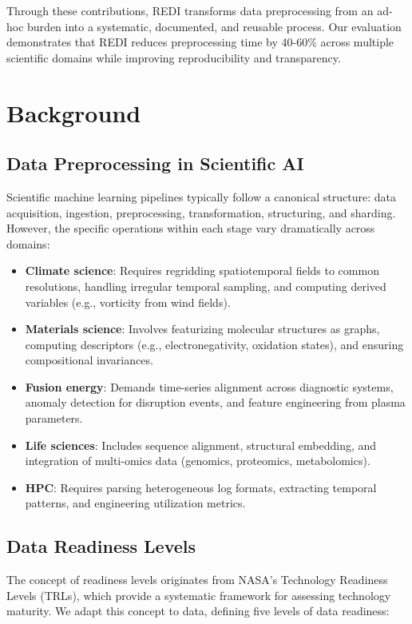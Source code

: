 \documentclass[11pt,letterpaper,twocolumn]{article}
\begin{document}
Through these contributions, REDI transforms data preprocessing from an ad-hoc burden into a systematic, documented, and reusable process. Our evaluation demonstrates that REDI reduces preprocessing time by 40-60\% across multiple scientific domains while improving reproducibility and transparency.

\section{Background}

\subsection{Data Preprocessing in Scientific AI}

Scientific machine learning pipelines typically follow a canonical structure: data acquisition, ingestion, preprocessing, transformation, structuring, and sharding. However, the specific operations within each stage vary dramatically across domains:

\begin{itemize}
    \item \textbf{Climate science}: Requires regridding spatiotemporal fields to common resolutions, handling irregular temporal sampling, and computing derived variables (e.g., vorticity from wind fields).
    \item \textbf{Materials science}: Involves featurizing molecular structures as graphs, computing descriptors (e.g., electronegativity, oxidation states), and ensuring compositional invariances.
    \item \textbf{Fusion energy}: Demands time-series alignment across diagnostic systems, anomaly detection for disruption events, and feature engineering from plasma parameters.
    \item \textbf{Life sciences}: Includes sequence alignment, structural embedding, and integration of multi-omics data (genomics, proteomics, metabolomics).
    \item \textbf{HPC}: Requires parsing heterogeneous log formats, extracting temporal patterns, and engineering utilization metrics.
\end{itemize}

\subsection{Data Readiness Levels}

The concept of readiness levels originates from NASA's Technology Readiness Levels (TRLs), which provide a systematic framework for assessing technology maturity. We adapt this concept to data, defining five levels of data readiness:
\end{document}
